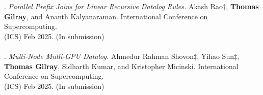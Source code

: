 \paper. \textit{Parallel Prefix Joins for Linear Recursive Datalog Rules.}
Akash Rao$\dagger$, \textbf{Thomas Gilray}, and Ananth Kalyanaraman.
International Conference on Supercomputing.
\\(ICS) Feb 2025. (In submission)
\\ \vspace{-0.1cm}\\
\paper. \textit{Multi-Node Mutli-GPU Datalog.}
Ahmedur Rahman Shovon$\ddagger$, Yihao Sun$\ddagger$, \textbf{Thomas Gilray}, Sidharth Kumar, and Kristopher Micinski.
International Conference on Supercomputing.
\\(ICS) Feb 2025. (In submission)
\\ \vspace{-0.1cm}\\
